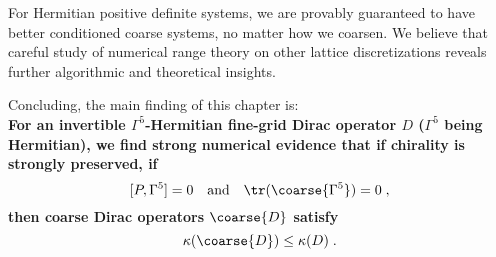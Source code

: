 
For Hermitian positive definite systems, we are provably guaranteed to have better conditioned coarse systems, no matter how we coarsen.
We believe that careful study of numerical range theory on other lattice discretizations reveals further algorithmic and theoretical insights.

Concluding, the main finding of this chapter is:\\
\textbf{
For an invertible $\Gamma^{5}$-Hermitian fine-grid Dirac operator $D$ ($\Gamma^{5}$ being Hermitian), we find strong numerical evidence that 
if chirality is strongly preserved, \ie if
\begin{equation} \label{eq:strong:chrality:preservation}
[P, \Gamma^{5}] = 0
\quad
\text{and}
\quad
\tr(\coarse{\Gamma^5}) = 0 \;,
\end{equation}
then coarse Dirac operators $\coarse{D}$ satisfy
\begin{equation}
\kappa(\coarse{D}) \leq \kappa(D) \;.
\end{equation}
}

